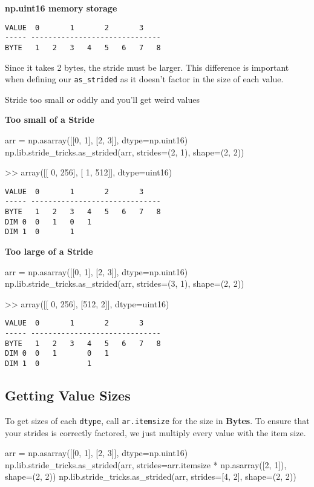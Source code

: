 \documentclass[oneside, 12pt]{report}
\begin{document}
\textbf{np.uint16 memory storage}
\begin{verbatim}
VALUE  0       1       2       3   
----- ------------------------------
BYTE   1   2   3   4   5   6   7   8
\end{verbatim}

Since it takes 2 bytes, the stride must be larger. This difference is important when defining our \verb+as_strided+ as it doesn't factor in the size of each value.

Stride too small or oddly and you'll get weird values

\textbf{Too small of a Stride}
\begin{python}
arr = np.asarray([[0, 1], [2, 3]], dtype=np.uint16)
np.lib.stride_tricks.as_strided(arr, strides=(2, 1), shape=(2, 2))

>> array([[  0, 256],
          [  1, 512]], dtype=uint16)
\end{python}

\begin{verbatim}
VALUE  0       1       2       3   
----- ------------------------------
BYTE   1   2   3   4   5   6   7   8
DIM 0  0   1   0   1   
DIM 1  0       1
\end{verbatim}

\textbf{Too large of a Stride}
\begin{python}
arr = np.asarray([[0, 1], [2, 3]], dtype=np.uint16)
np.lib.stride_tricks.as_strided(arr, strides=(3, 1), shape=(2, 2))

>> array([[  0, 256],
          [512,   2]], dtype=uint16)
\end{python}

\begin{verbatim}
VALUE  0       1       2       3   
----- ------------------------------
BYTE   1   2   3   4   5   6   7   8
DIM 0  0   1       0   1   
DIM 1  0           1
\end{verbatim}

\subsection{Getting Value Sizes}

To get sizes of each \verb+dtype+, call \verb+ar.itemsize+ for the size in \textbf{Bytes}. To ensure that your strides is correctly factored, we just multiply every value with the item size.

\begin{python}
arr = np.asarray([[0, 1], [2, 3]], dtype=np.uint16)
np.lib.stride_tricks.as_strided(arr,
                                strides=arr.itemsize * np.asarray([2, 1]),
                                shape=(2, 2))
np.lib.stride_tricks.as_strided(arr,
                                strides=[4, 2], shape=(2, 2))
\end{python}
\end{document}
